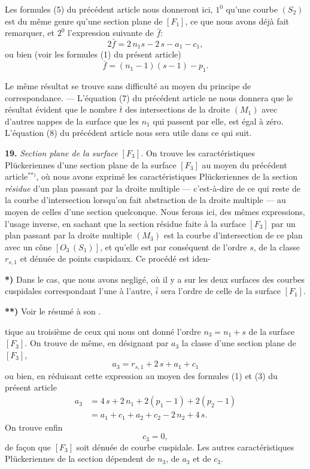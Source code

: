 \documentclass{article}
\begin{document}
Les formules (5) du précédent article nous donneront ici, $1^0$ qu'une courbe $(S_2)$ est du même genre qu'une section plane de $[F_1]$, ce que nous avons déjà fait remarquer, et $2^0$ l'expression suivante de $\bar{f}$:
\[
2\bar{f} = 2\,n_1 s - 2\,s - a_1 - c_1,
\]
ou bien (voir les formules (1) du présent article)
\[
\bar{f} = (n_1 - 1)(s - 1) - p_1.
\]

Le même résultat se trouve sans difficulté au moyen du principe de correspondance. --- L'équation (7) du précédent article ne nous donnera que le résultat évident que le nombre $\bar{t}$ des intersections de la droite $(M_1)$ avec d'autres nappes de la surface que les $n_1$ qui passent par elle, est égal à zéro. L'équation (8) du précédent article nous sera utile dans ce qui suit.

\textbf{19.} \emph{Section plane de la surface $[F_3]$.} On trouve les caractéristiques Plückeriennes d'une section plane de la surface $[F_3]$ au moyen du précédent article${}^{**)}$, où nous avons exprimé les caractéristiques Plückeriennes de la section \emph{résidue} d'un plan passant par la droite multiple --- c'est-à-dire de ce qui reste de la courbe d'intersection lorsqu'on fait abstraction de la droite multiple --- au moyen de celles d'une section quelconque. Nous ferons ici, des mêmes expressions, l'usage inverse, en sachant que la section résidue faite à la surface $[F_3]$ par un plan passant par la droite multiple $(M_3)$ est la courbe d'intersection de ce plan avec un cône $[O_3\,(S_1)]$, et qu'elle est par conséquent de l'ordre $s$, de la classe $r_{s, 1}$ et dénuée de points cuspidaux. Ce procédé est iden-

\textbf{*)} Dans le cas, que nous avons negligé, où il y a sur les deux surfaces des courbes cuspidales correspondant l'une à l'autre, $\bar{i}$ sera l'ordre de celle de la surface $[F_1]$.

\textbf{**)} Voir le résumé à son .

tique au troisième de ceux qui nous ont donné l'ordre $n_3 = n_1 + s$ de la surface $[F_3]$. On trouve de même, en désignant par $a_3$ la classe d'une section plane de $[F_3]$,
\[
a_3 = r_{s, 1} + 2\,s + a_1 + c_1
\]
ou bien, en réduisant cette expression au moyen des formules (1) et (3) du présent article
\[
\begin{aligned}
a_3 &= 4\,s + 2\,n_1 + 2(p_1 - 1) + 2(p_2 - 1) \\
&= a_1 + c_1 + a_2 + c_2 - 2\,n_2 + 4\,s.
\end{aligned} \tag{4}
\]
On trouve enfin
\[
c_3 = 0, \tag{5}
\]
de façon que $[F_3]$ soit dénuée de courbe cuspidale. Les autres caractéristiques Plückeriennes de la section dépendent de $n_3$, de $a_3$ et de $c_3$.
\end{document}
